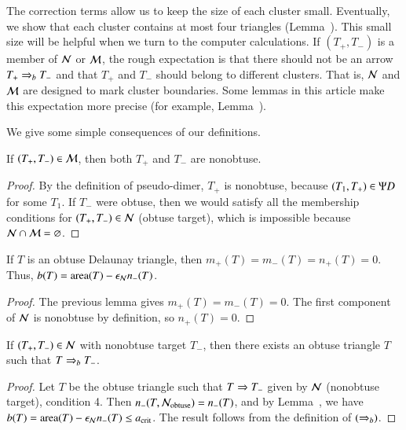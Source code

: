 The correction terms allow us to keep the size of each cluster small.
Eventually, we show that each cluster contains at most four triangles
(Lemma~).  This small size will be helpful when we
turn to the computer calculations.  If $(T_+,T_-)$ is a member of $\mathcal N$
or $\mathcal M$, the rough expectation is that there should not be an arrow
$T_+\Rightarrow_{b} T_-$ and that $T_+$ and $T_-$ should belong to different
clusters.  That is, $\mathcal N$ and $\mathcal M$ are designed to mark cluster
boundaries.  Some lemmas in this article make this expectation more
precise (for example, Lemma~).

We give some simple consequences of our definitions.

\begin{lemma} 
  If $(T_+,T_-)\in \mathcal M$, then both $T_+$ and $T_-$ are nonobtuse.
\end{lemma}

\begin{proof} 
  By the definition of pseudo-dimer, $T_+$ is nonobtuse, because
  $(T_1,T_+)\in\Psi D$ for some $T_1$.  If $T_-$ were obtuse, then we
  would satisfy all the membership conditions for $(T_+,T_-)\in \mathcal N$
  (obtuse target), which is impossible because $\mathcal N\cap \mathcal M =
  \varnothing$.
\end{proof}

\begin{lemma}[obtuse $b$] 
  If $T$ is an obtuse Delaunay triangle, then
  $m_+(T)=m_-(T)=n_+(T)=0$.  Thus, $b(T) = {\operatorname{area}}(T) - \epsilon_{\mathcal N} n_-(T)$.
\end{lemma}

\begin{proof} 
  The previous lemma gives $m_+(T)=m_-(T)=0$.  The first component of
  $\mathcal N$ is nonobtuse by definition, so $n_+(T)=0$.
\end{proof}

\begin{corollary} 
  If $(T_+,T_-)\in\mathcal N$ with nonobtuse target $T_-$, then there exists
  an obtuse triangle $T$ such that $T\Rightarrow_{b} T_-$.
\end{corollary}

\begin{proof} 
  Let $T$ be the obtuse triangle such that $T\Rightarrow T_-$ given by $\mathcal N$
  (nonobtuse target), condition 4.  Then $n_-(T,\mathcal N_{\text{obtuse}}) =
  n_-(T)$, and by Lemma~, we have $b(T) =
  {\operatorname{area}}(T)-\epsilon_{\mathcal N} n_-(T)\le a_\text{crit}$.  The result follows from the
  definition of $(\Rightarrow_{b})$.
\end{proof}


